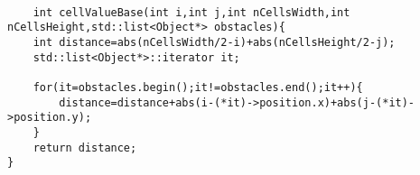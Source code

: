 \begin{lstlisting}

	int cellValueBase(int i,int j,int nCellsWidth,int nCellsHeight,std::list<Object*> obstacles){
	int distance=abs(nCellsWidth/2-i)+abs(nCellsHeight/2-j);
	std::list<Object*>::iterator it;

	for(it=obstacles.begin();it!=obstacles.end();it++){
		distance=distance+abs(i-(*it)->position.x)+abs(j-(*it)->position.y);
	}
	return distance;
}

\end{lstlisting}